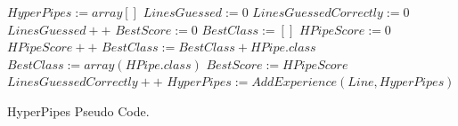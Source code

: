 \begin{program}
\begin{algorithmic}
\State $HyperPipes := array[]$
\State $LinesGuessed := 0$
\State $LinesGuessedCorrectly := 0$
\State $LinesGuessed++$
\State $BestScore := 0$
\State $BestClass := []$
\State $HPipeScore := 0$
\State $HPipeScore++$
\EndIf
\EndFor
{}
\State $BestClass := BestClass + HPipe.class$
\Else
\State $BestClass := array(HPipe.class)$
\State $BestScore := HPipeScore$ 
\EndIf
\EndIf
\EndFor
{}
\State $LinesGuessedCorrectly++$
\EndIf
\EndIf
\State $HyperPipes := AddExperience(Line,HyperPipes)$
\EndFor
\EndProcedure
\end{algorithmic}
\caption{HyperPipes Pseudo Code.}\label{Pseudocode}
\end{program}





